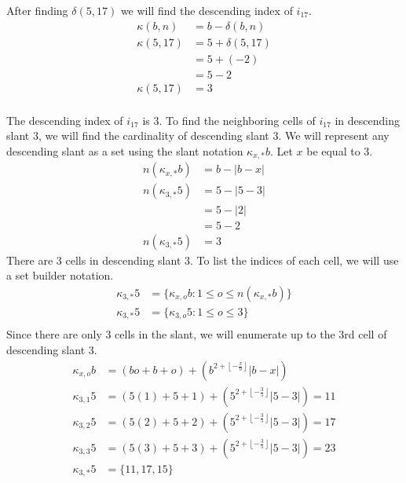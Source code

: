 \documentclass[letterpaper, twoside,12pt]{book}
\begin{document}
    After finding $\delta(5,17)$ we will find the descending index of $i_{17}$.
    \begin{equation*}
        \begin{split}
            \kappa(b,n) &= b - \delta(b,n)\\
            \kappa(5,17) &= 5 + \delta(5,17)\\
                &= 5 + (-2)\\
                &= 5 - 2\\
            \kappa(5,17) &= 3\\
        \end{split}
    \end{equation*}

    The descending index of $i_{17}$ is 3. To find the neighboring cells of $i_{17}$ in descending slant 3, we will find the cardinality of descending slant 3. We will represent any descending slant as a set using the slant notation $\kappa_{x,*}b$. Let $x$ be equal to 3.
    \begin{equation*}
        \begin{split}
            n(\kappa_{x,*}b) &= b - |b - x| \\
            n(\kappa_{3,*}5) &= 5 - |5 - 3| \\
                &= 5 - |2| \\
                &= 5 - 2 \\
            n(\kappa_{3,*}5) &= 3 
        \end{split}
    \end{equation*}
    There are 3 cells in descending slant 3. To list the indices of each cell, we will use a set builder notation.
    \begin{equation*}
        \begin{split}
            \kappa_{3,*}5 &= \{ \kappa_{x,o}b : 1 \leq o \leq n(\kappa_{x,*}b) \} \\
            \kappa_{3,*}5 &= \{ \kappa_{3,o}5 : 1 \leq o \leq 3 \} \\
        \end{split}
    \end{equation*}
    Since there are only 3 cells in the slant, we will enumerate up to the 3rd cell of descending slant 3.
    \begin{equation*}
        \begin{split}
            \kappa_{x,o}b &= (bo + b + o) + (b^{2 + \left\lfloor -\frac{x}{b} \right\rfloor }|b-x|) \\
            \kappa_{3,1}5 &= (5(1) + 5 + 1) + (5^{2 + \left\lfloor -\frac{3}{5} \right\rfloor }|5-3|) = 11\\
            \kappa_{3,2}5 &= (5(2) + 5 + 2) + (5^{2 + \left\lfloor -\frac{3}{5} \right\rfloor }|5-3|) = 17\\
            \kappa_{3,3}5 &= (5(3) + 5 + 3) + (5^{2 + \left\lfloor -\frac{3}{5} \right\rfloor }|5-3|) = 23\\
            \kappa_{3,*}5 &= \{11, 17, 15\}
        \end{split}
    \end{equation*}
\end{document}
